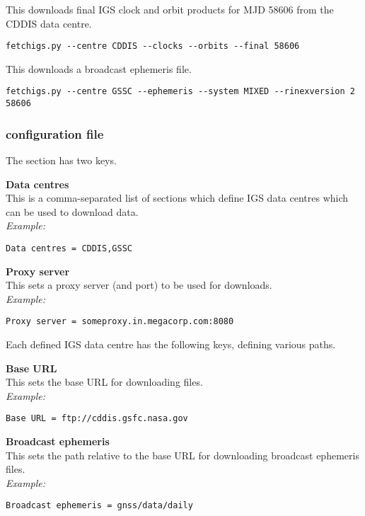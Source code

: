 This downloads final IGS clock and orbit products for MJD 58606 from the CDDIS data centre.\\
\begin{lstlisting}
fetchigs.py --centre CDDIS --clocks --orbits --final 58606
\end{lstlisting}

This downloads a  broadcast ephemeris file.\\
\begin{lstlisting}
fetchigs.py --centre GSSC --ephemeris --system MIXED --rinexversion 2 58606
\end{lstlisting}

\subsubsection{configuration file}

The \cc{[Main]} section has two keys.

{\bfseries Data centres}\\
This is a comma-separated list of sections which define IGS data centres which can be used to download data.\\
\textit{Example:}
\begin{lstlisting}
Data centres = CDDIS,GSSC
\end{lstlisting}

{\bfseries Proxy server}\\
This sets a proxy server (and port) to be used for downloads.\\
\textit{Example:}
\begin{lstlisting}
Proxy server = someproxy.in.megacorp.com:8080
\end{lstlisting}

Each defined IGS data centre has the following keys, defining various paths.

{\bfseries Base URL}\\
This sets the base URL for downloading files.\\
\textit{Example:}
\begin{lstlisting}
Base URL = ftp://cddis.gsfc.nasa.gov
\end{lstlisting}

{\bfseries Broadcast ephemeris}\\
This sets the path relative to the base URL for downloading broadcast ephemeris files.\\
\textit{Example:}
\begin{lstlisting}
Broadcast ephemeris = gnss/data/daily
\end{lstlisting}

